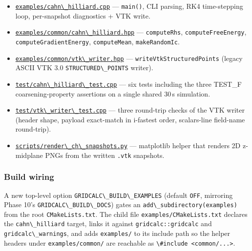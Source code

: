 \begin{itemize}
\tightlist
\item
  \href{../../../examples/cahn_hilliard.cpp}{\passthrough{\lstinline!examples/cahn\_hilliard.cpp!}}
  --- \passthrough{\lstinline!main()!}, CLI parsing, RK4 time-stepping
  loop, per-snapshot diagnostics + VTK write.
\item
  \href{../../../examples/common/cahn_hilliard.hpp}{\passthrough{\lstinline!examples/common/cahn\_hilliard.hpp!}}
  --- \passthrough{\lstinline!computeRhs!},
  \passthrough{\lstinline!computeFreeEnergy!},
  \passthrough{\lstinline!computeGradientEnergy!},
  \passthrough{\lstinline!computeMean!},
  \passthrough{\lstinline!makeRandomIc!}.
\item
  \href{../../../examples/common/vtk_writer.hpp}{\passthrough{\lstinline!examples/common/vtk\_writer.hpp!}}
  --- \passthrough{\lstinline!writeVtkStructuredPoints!} (legacy ASCII
  VTK 3.0 \passthrough{\lstinline!STRUCTURED\_POINTS!} writer).
\item
  \href{../../../test/cahn_hilliard_test.cpp}{\passthrough{\lstinline!test/cahn\_hilliard\_test.cpp!}}
  --- six tests including the three TEST\_F coarsening-property
  assertions on a single shared 30\,s simulation.
\item
  \href{../../../test/vtk_writer_test.cpp}{\passthrough{\lstinline!test/vtk\_writer\_test.cpp!}}
  --- three round-trip checks of the VTK writer (header shape,
  payload exact-match in i-fastest order, scalars-line field-name
  round-trip).
\item
  \href{../../../scripts/render_ch_snapshots.py}{\passthrough{\lstinline!scripts/render\_ch\_snapshots.py!}}
  --- matplotlib helper that renders 2D z-midplane PNGs from the
  written \passthrough{\lstinline!.vtk!} snapshots.
\end{itemize}

\subsubsection{Build wiring}\label{phase12-build}

A new top-level option
\passthrough{\lstinline!GRIDCALC\_BUILD\_EXAMPLES!} (default
\passthrough{\lstinline!OFF!}, mirroring Phase 10's
\passthrough{\lstinline!GRIDCALC\_BUILD\_DOCS!}) gates an
\passthrough{\lstinline!add\_subdirectory(examples)!} from the root
\passthrough{\lstinline!CMakeLists.txt!}. The child file
\passthrough{\lstinline!examples/CMakeLists.txt!} declares the
\passthrough{\lstinline!cahn\_hilliard!} target, links it against
\passthrough{\lstinline!gridcalc::gridcalc!} and
\passthrough{\lstinline!gridcalc\_warnings!}, and adds
\passthrough{\lstinline!examples/!} to its include path so the helper
headers under \passthrough{\lstinline!examples/common/!} are reachable
as \passthrough{\lstinline!\#include <common/...>!}.


